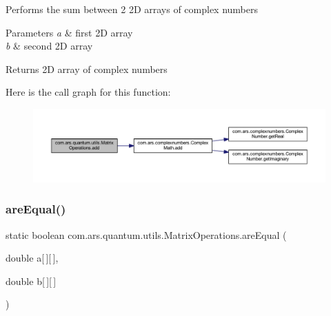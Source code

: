 Performs the sum between 2 2D arrays of complex numbers


\begin{DoxyParams}{Parameters}
{\em a} & first 2D array \\
\hline
{\em b} & second 2D array \\
\hline
\end{DoxyParams}
\begin{DoxyReturn}{Returns}
2D array of complex numbers 
\end{DoxyReturn}
Here is the call graph for this function\+:\nopagebreak
\begin{figure}[H]
\begin{center}
\leavevmode
\includegraphics[width=350pt]{classcom_1_1ars_1_1quantum_1_1utils_1_1_matrix_operations_aa9b253355d52423992f5208ff2d72b15_cgraph}
\end{center}
\end{figure}
\hypertarget{classcom_1_1ars_1_1quantum_1_1utils_1_1_matrix_operations_a04088b05f027b30f91558dba4a806f80}{}\label{classcom_1_1ars_1_1quantum_1_1utils_1_1_matrix_operations_a04088b05f027b30f91558dba4a806f80} 
\subsubsection{\texorpdfstring{are\+Equal()}{areEqual()}\hspace{0.1cm}{\footnotesize\ttfamily [1/2]}}
{\footnotesize\ttfamily static boolean com.\+ars.\+quantum.\+utils.\+Matrix\+Operations.\+are\+Equal (\begin{DoxyParamCaption}\item[{double}]{a\mbox{[}$\,$\mbox{]}\mbox{[}$\,$\mbox{]},  }\item[{double}]{b\mbox{[}$\,$\mbox{]}\mbox{[}$\,$\mbox{]} }\end{DoxyParamCaption})\hspace{0.3cm}{\ttfamily [static]}}

